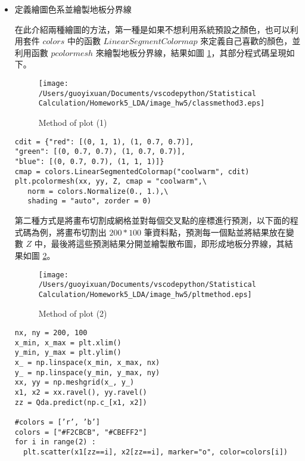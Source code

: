\begin{itemize}
\bigskip
\begin{lstlisting}
Z = Lda.predict_proba(np.c_[xx.ravel(), yy.ravel()])
Z = Qda.predict_proba(np.c_[xx.ravel(), yy.ravel()])
Z = Z[:, 1].reshape(xx.shape)
\end{lstlisting}

\item{} 定義繪圖色系並繪製地板分界線

在此介紹兩種繪圖的方法，第一種是如果不想利用系統預設之顏色，也可以利用套件 $colors$ 中的函數 $LinearSegmentColormap$ 來定義自己喜歡的顏色，並利用函數 $pcolormesh$ 來繪製地板分界線，結果如圖 \ref{fig:pltmethod1}，其部分程式碼呈現如下。

\begin{figure}[H]
    \centering
        \texttt{[image: /Users/guoyixuan/Documents/vscodepython/Statistical Calculation/Homework5\_LDA/image\_hw5/classmethod3.eps]}
    \caption{Method of plot (1)}
    \label{fig:pltmethod1}
\end{figure}

\bigskip
\begin{lstlisting}
cdit = {"red": [(0, 1, 1), (1, 0.7, 0.7)],
"green": [(0, 0.7, 0.7), (1, 0.7, 0.7)],
"blue": [(0, 0.7, 0.7), (1, 1, 1)]}
cmap = colors.LinearSegmentedColormap("coolwarm", cdit)
plt.pcolormesh(xx, yy, Z, cmap = "coolwarm",\
   norm = colors.Normalize(0., 1.),\
   shading = "auto", zorder = 0)

\end{lstlisting}

第二種方式是將畫布切割成網格並對每個交叉點的座標進行預測，以下面的程式碼為例，將畫布切割出 $200*100$ 筆資料點，預測每一個點並將結果放在變數 $Z$ 中，最後將這些預測結果分開並繪製散布圖，即形成地板分界線，其結果如圖 \ref{fig:pltmethod2}。

\begin{figure}[H]
    \centering
        \texttt{[image: /Users/guoyixuan/Documents/vscodepython/Statistical Calculation/Homework5\_LDA/image\_hw5/pltmethod.eps]}
    \caption{Method of plot (2)}
    \label{fig:pltmethod2}
\end{figure}

\bigskip
\begin{lstlisting}
nx, ny = 200, 100
x_min, x_max = plt.xlim()
y_min, y_max = plt.ylim()
x_ = np.linspace(x_min, x_max, nx)
y_ = np.linspace(y_min, y_max, ny)
xx, yy = np.meshgrid(x_, y_)
x1, x2 = xx.ravel(), yy.ravel()
zz = Qda.predict(np.c_[x1, x2])

#colors = [’r’, ’b’]
colors = ["#F2CBCB", "#CBEFF2"]
for i in range(2) :
  plt.scatter(x1[zz==i], x2[zz==i], marker="o", color=colors[i])
\end{lstlisting}



\end{itemize}
